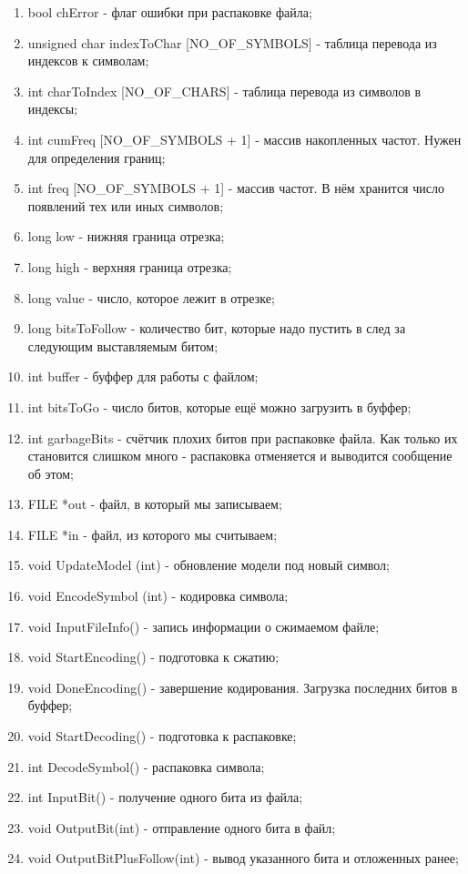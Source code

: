 \documentclass[12pt]{article}
\begin{document}
\begin{enumerate}
	\item bool chError - флаг ошибки при распаковке файла;
	\item unsigned char indexToChar [NO\_OF\_SYMBOLS] - таблица перевода из индексов к символам;
	\item int charToIndex [NO\_OF\_CHARS] - таблица перевода из символов в индексы;
	\item int cumFreq [NO\_OF\_SYMBOLS + 1] - массив накопленных частот. Нужен для определения границ;
	\item int freq [NO\_OF\_SYMBOLS + 1] - массив частот. В нём хранится число появлений тех или иных символов;
	\item long low - нижняя граница отрезка; 
	\item long high - верхняя граница отрезка;
	\item long value - число, которое лежит в отрезке;
	\item long bitsToFollow - количество бит, которые надо пустить в след за следующим выставляемым битом;
	\item int buffer - буффер для работы с файлом;
	\item int bitsToGo - число битов, которые ещё можно загрузить в буффер;
	\item int garbageBits - счётчик плохих битов при распаковке файла. Как только их становится слишком много - распаковка отменяется и выводится сообщение об этом;
	\item FILE *out - файл, в который мы записываем;
	\item FILE *in - файл, из которого мы считываем;
	\item void UpdateModel (int) - обновление модели под новый символ;
	\item void EncodeSymbol (int) - кодировка символа;
	\item void InputFileInfo() - запись информации о сжимаемом файле;
	\item void StartEncoding() - подготовка к сжатию;
	\item void DoneEncoding() - завершение кодирования. Загрузка последних битов в буффер;
	\item void StartDecoding() - подготовка к распаковке;
	\item int DecodeSymbol() - распаковка символа;
	\item int InputBit() - получение одного бита из файла;
	\item void OutputBit(int) - отправление одного бита в файл;
	\item void OutputBitPlusFollow(int) - вывод указанного бита и отложенных ранее;
\end{enumerate}
\end{document}
